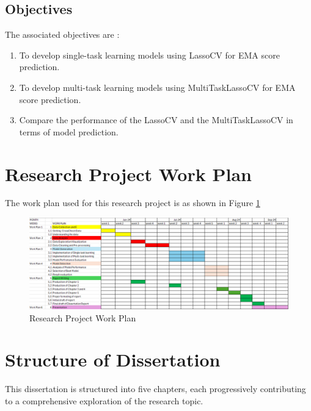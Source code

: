 \subsection{Objectives}
The associated objectives are :
\begin{enumerate}
    \item To develop single-task learning models using LassoCV for EMA score prediction.
    \item To develop multi-task learning models using MultiTaskLassoCV for EMA score prediction.
    \item Compare the performance of the LassoCV and the MultiTaskLassoCV in terms of model prediction.
\end{enumerate}

\section{Research Project Work Plan}
The work plan used for this research project is as shown in Figure \ref{work}
\begin{figure}[H]
\centering
\includegraphics[scale=0.25]{work_plan.png}
\caption{Research Project Work Plan}
\label{work}
\end{figure}

\bigskip
\goodbreak


\section{Structure of Dissertation}
This dissertation is structured into five chapters, each progressively contributing to a comprehensive exploration of the research topic.

